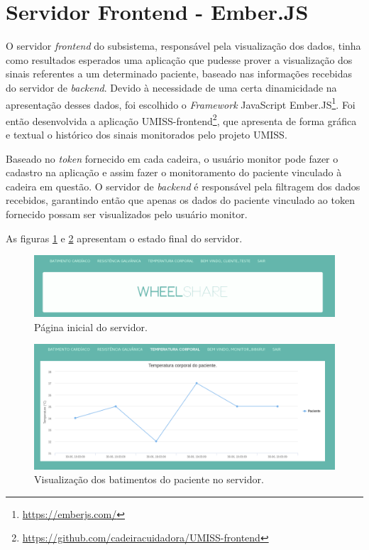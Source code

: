 \section{Servidor Frontend - Ember.JS}

O servidor \textit{frontend} do subsistema, responsável pela visualização dos
dados, tinha como resultados esperados uma aplicação que pudesse prover a
visualização dos sinais referentes a um determinado paciente, baseado nas
informações recebidas do servidor de \textit{backend}. Devido à necessidade de
uma certa dinamicidade na apresentação desses dados, foi escolhido o
\textit{Framework} JavaScript Ember.JS\footnote{\url{https://emberjs.com/}}.
Foi então desenvolvida a aplicação 
UMISS-frontend\footnote{\url{https://github.com/cadeiracuidadora/UMISS-frontend}},
que apresenta de forma gráfica e textual o histórico dos sinais monitorados pelo
projeto UMISS.

Baseado no \textit{token} fornecido em cada cadeira, o usuário monitor pode
fazer o cadastro na aplicação e assim fazer o monitoramento do
paciente vinculado à cadeira em questão. O servidor de \textit{backend} é
responsável pela filtragem dos dados recebidos, garantindo então que apenas os
dados do paciente vinculado ao token fornecido possam ser visualizados pelo
usuário monitor.

As figuras \ref{fig:wheelshare1} e \ref{fig:wheelshare2}
apresentam o estado final do servidor.

\begin{figure}[h!]
    \begin{center}
        \includegraphics[width=\textwidth]{figuras/wheelshare1.png}
    \end{center}
    \caption{Página inicial do servidor.}
    \label{fig:wheelshare1}
\end{figure}

\begin{figure}[h!]
    \begin{center}
        \includegraphics[width=\textwidth]{figuras/wheelshare2.png}
    \end{center}
    \caption{Visualização dos batimentos do paciente no servidor.}
    \label{fig:wheelshare2}
\end{figure}


